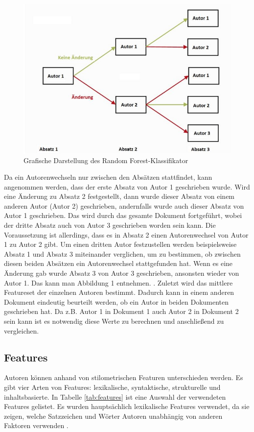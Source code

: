 \documentclass[conference]{IEEEtran}
\begin{document}
	\begin{figure}[h]
		\centering
		\includegraphics[width=0.7\linewidth]{Unbenannt}
		\caption{Grafische Darstellung des Random Forest-Klassifikator}
		\label{fig:algorithm}
	\end{figure}
	
	
	Da ein Autorenwechseln nur zwischen den Absätzen stattfindet, kann angenommen werden, dass der erste Absatz von Autor 1 geschrieben wurde. Wird eine Änderung zu Absatz 2 festgestellt, dann wurde dieser Absatz von einem anderen Autor (Autor 2) geschrieben, andernfalls wurde auch dieser Absatz von Autor 1 geschrieben. Das wird durch das gesamte Dokument fortgeführt, wobei der dritte Absatz auch von Autor 3  geschrieben worden sein kann. Die Voraussetzung ist allerdings, dass es in Absatz 2 einen Autorenwechsel von Autor 1 zu Autor 2 gibt. Um einen dritten Autor festzustellen werden beispielsweise Absatz 1 und Absatz 3 miteinander verglichen, um zu bestimmen, ob zwischen diesen beiden Absätzen ein Autorenwechsel stattgefunden hat. Wenn es eine Änderung gab wurde Absatz 3 von Autor 3 geschrieben, ansonsten wieder von Autor 1. Das kann man Abbildung 1 entnehmen. 
	.
	Zuletzt wird das mittlere Featureset der einzelnen Autoren bestimmt. Dadurch kann in einem anderen Dokument eindeutig beurteilt werden, ob ein Autor in beiden Dokumenten geschrieben hat. Da z.B. Autor 1 in Dokument 1 auch Autor 2 in Dokument 2 sein kann ist es notwendig diese Werte zu berechnen und anschließend zu vergleichen.
	
\subsection{Features}
	Autoren können anhand von stilometrischen Featuren unterschieden werden. Es gibt vier Arten von Features: lexikalische, syntaktische, strukturelle und inhaltsbasierte. In Tabelle \ref{tab:features} ist eine Auswahl der verwendeten Features gelistet. Es wurden hauptsächlich lexikalische Features verwendet, da sie zeigen, welche Satzzeichen und Wörter Autoren unabhängig von anderen Faktoren verwenden \cite{mf_b1}.
	 
\end{document}
